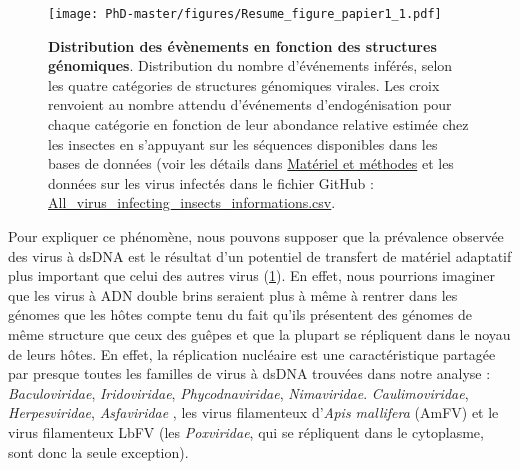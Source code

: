 \begin{figure}[!htpbt]
\captionsetup{font=footnotesize}
 \centering
  \texttt{[image: PhD-master/figures/Resume\_figure\_papier1\_1.pdf]}
\caption[Paper1:Figures principales récapitulatives du chapitre1\_1]{\textbf{Distribution des évènements en fonction des structures génomiques}. Distribution du nombre d'événements inférés, selon les quatre catégories de structures génomiques virales. Les croix renvoient au nombre attendu d'événements d'endogénisation pour chaque catégorie en fonction de leur abondance relative estimée chez les insectes en s'appuyant sur les séquences disponibles dans les bases de données (voir les détails dans \hyperref[sec:MM-8]{Matériel et méthodes} et les données sur les virus infectés dans le fichier GitHub : \href{https://github.com/BenjaminGuinet/PhD_defense/blob/main/Supplementary_paper1/All_virus_infecting_insects_informations.csv}{All\_virus\_infecting\_insects\_informations.csv}.}
\label{figure:Resume_figure_papier1_1}
\end{figure}

Pour expliquer ce phénomène, nous pouvons supposer que la prévalence observée des virus à dsDNA est le résultat d'un potentiel de transfert de matériel adaptatif plus important que celui des autres virus (\figurename{\ref{figure:Resume_figure_papier1_1}}). En effet, nous pourrions imaginer que les virus à ADN double brins seraient plus à même à rentrer dans les génomes que les hôtes compte tenu du fait qu'ils présentent des génomes de même structure que ceux des guêpes et que la plupart se répliquent dans le noyau de leurs hôtes. En effet, la réplication nucléaire est une caractéristique partagée par presque toutes les familles de virus à dsDNA trouvées dans notre analyse : \textit{Baculoviridae}, \textit{Iridoviridae}, \textit{Phycodnaviridae}, \textit{Nimaviridae}. \textit{Caulimoviridae}, \textit{Herpesviridae}, \textit{Asfaviridae} \citep{schmid_dna_2014,harrison_ictv_2020,international_committee_on_taxonomy_of_viruses_virus_2012,teycheney_ictv_2020,verbruggen_molecular_2016}, les virus filamenteux d'\textit{Apis mallifera} (AmFV) \citep{clark_filamentous_1978} et le virus filamenteux LbFV \citep{varaldi_artifical_2006} (les \textit{Poxviridae}, qui se répliquent dans le cytoplasme, sont donc la seule exception). \\

